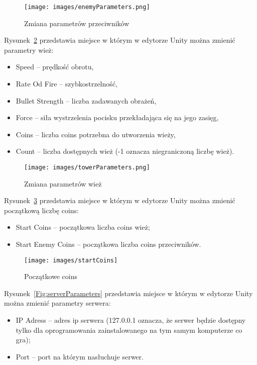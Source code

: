 \begin{figure}
\texttt{[image: images/enemyParameters.png]}
\caption{Zmiana parametrów przeciwników}
\label{Fig:enemyParameters}
\end{figure}  

Rysunek~\ref{Fig:towerParameters}  przedstawia miejsce w którym w edytorze Unity można zmienić parametry wież:
\begin{itemize}
\item Speed -- prędkość obrotu,
\item Rate Od Fire -- szybkostrzelność,
\item Bullet Strength -- liczba zadawanych obrażeń,
\item Force -- siła wystrzelenia pocisku przekładająca się na jego zasięg,
\item Coins -- liczba coins potrzebna do utworzenia wieży,
\item Count -- liczba dostępnych wież (-1 oznacza niegraniczoną liczbę wież).  
\end{itemize}

\begin{figure}
\texttt{[image: images/towerParameters.png]}
\caption{Zmiana parametrów wież}
\label{Fig:towerParameters}
\end{figure}  

Rysunek~\ref{Fig:startCoins}  przedstawia miejsce w którym w edytorze Unity można zmienić początkową liczbę coins:
\begin{itemize}
\item Start Coins --  początkowa liczba coins wież; 
\item Start Enemy Coins --  początkowa liczba coins przeciwników. 
\end{itemize}


\begin{figure}
\texttt{[image: images/startCoins]}
\caption{Początkowe coins}
\label{Fig:startCoins}
\end{figure} 

Rysunek~\ref{Fig:serverParameters}  przedstawia miejsce w którym w edytorze Unity można zmienić parametry serwera: 
\begin{itemize}
\item IP Adress --  adres ip serwera (127.0.0.1 oznacza, że serwer będzie dostępny tylko dla oprogramowania zainstalowanego na tym samym komputerze co gra); 
\item Port --  port na którym nasłuchuje serwer. 
\end{itemize}

